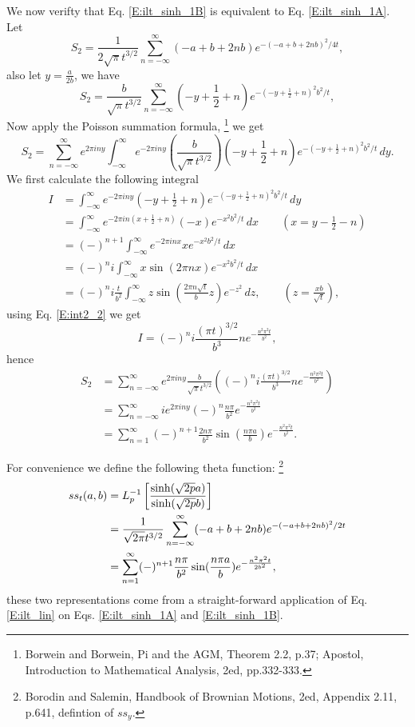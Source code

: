 We now verifty that Eq. \ref{E:ilt_sinh_1B} is equivalent to Eq.
\ref{E:ilt_sinh_1A}. 
Let
\[
  S_2 = \frac{1}{2\sqrt{\pi} t^{{3/2}} }
 		    \sum_{n=-\infty}^{\infty}  (-a+b+2nb) e^{-(-a+b+2nb)^2/4t},
\]
also let $y=\frac{a}{2b}$, we have
\[
	S_2 = \frac{b}{\sqrt{\pi} t^{3/2}}
	\sum_{n=-\infty}^{\infty}  (-y+\frac{1}{2}+n) e^{-(-y+\frac{1}{2}+n)^2 b^2/t},
\]
Now apply the Poisson summation formula, 
\footnote{Borwein and Borwein, Pi and the AGM, Theorem 2.2, p.37; Apostol,
Introduction to Mathematical Analysis, 2ed, pp.332-333.}
we get
\[
	S_2 
	= \sum_{n=-\infty}^{\infty} e^{2\pi i n y}
    \int_{-\infty}^{\infty} e^{-2\pi i n y}
		  \left( \frac{b}{\sqrt{\pi} t^{3/2}} \right)
      (-y+\frac{1}{2}+n) e^{-(-y+\frac{1}{2}+n)^2 b^2/t} \, dy.
\]
We first calculate the following integral
\begin{align*}
	I 
	&= \int_{-\infty}^{\infty} e^{-2\pi i n y}
      (-y+\frac{1}{2}+n) e^{-(-y+\frac{1}{2}+n)^2 b^2/t} \, dy \\
  &= \int_{-\infty}^{\infty} e^{-2\pi i n (x+\frac{1}{2} + n) }
			(-x) e^{-x^2 b^2/t} \, dx       \qquad (x=y-\frac{1}{2}-n) \\
	&= (-)^{n+1} \int_{-\infty}^{\infty} e^{-2\pi i n x} x e^{-x^2 b^2/t} \, dx \\
	&= (-)^n i \int_{-\infty}^{\infty} x \sin (2\pi n x) e^{-x^2 b^2/t} \, dx \\
	&= (-)^n i \frac{t}{b^2} \int_{-\infty}^{\infty} z 
			\sin \left( \frac{2\pi n \sqrt{t}}{b} z \right) e^{-z^2} \, dz,
			\qquad (z=\frac{x b}{\sqrt{t}}),
\end{align*}
using Eq. \ref{E:int2_2} we get
\[
	I = (-)^n i \frac{(\pi t)^{3/2}}{b^3} n e^{-\frac{n^2 \pi^2 t}{b^2}},
\]
hence
\begin{align*}
	S_2
	&= \sum_{n=-\infty}^{\infty} e^{2\pi i n y} \frac{b}{\sqrt{\pi}t^{3/2}}
	   \left( (-)^n i \frac{(\pi t)^{3/2}}{b^3} n e^{-\frac{n^2 \pi^2 t}{b^2}}
		 \right)  \\
  &= \sum_{n=-\infty}^{\infty} i e^{2\pi i n y} (-)^n \frac{n\pi}{b^2}
	       e^{-\frac{n^2 \pi^2 t}{b^2}}   \\
  &= \sum_{n=1}^{\infty} (-)^{n+1} \frac{2n\pi}{b^2} \sin(\frac{n\pi a}{b})
	     e^{-\frac{n^2 \pi^2 t}{b^2}}.
\end{align*}

For convenience we define the following theta function:
\footnote{Borodin and Salemin, Handbook of Brownian Motions, 2ed, Appendix 2.11, 
p.641, defintion of $ss_y$.}
\begin{align} \label{E:theta_ss}
	ss_t(a,b)
	&= L_p^{-1}\left[ \frac{\sinh (\sqrt{2p} a)}{\sinh (\sqrt{2p} b)} \right] 
	  \notag \\
	&= \frac{1}{\sqrt{2\pi} t^{{3/2}} }
 		 \sum_{n=-\infty}^{\infty}  (-a+b+2nb) e^{-(-a+b+2nb)^2/2t} \notag \\
  &= \sum_{n=1}^{\infty} (-)^{n+1} \frac{n\pi}{b^2} \sin(\frac{n\pi a}{b})
	     e^{-\frac{n^2 \pi^2 t}{2 b^2}},   
\end{align}
these two representations come from a straight-forward application of Eq. 
\ref{E:ilt_lin} on Eqs. \ref{E:ilt_sinh_1A} and \ref{E:ilt_sinh_1B}.

